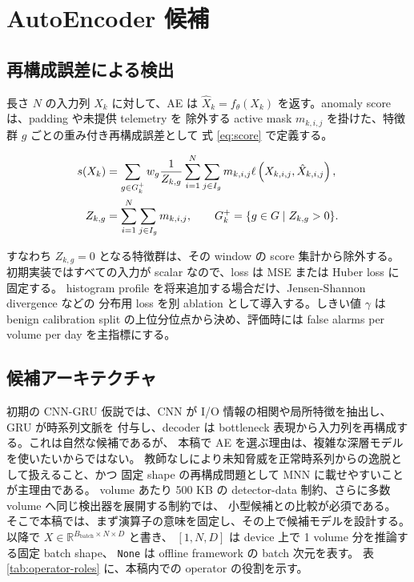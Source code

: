 \section{AutoEncoder 候補}

\subsection{再構成誤差による検出}

長さ $N$ の入力列 $X_k$ に対して、AE は
$\hat{X}_k=f_{\theta}(X_k)$ を返す。anomaly score は、padding や未提供 telemetry を
除外する active mask $m_{k,i,j}$ を掛けた、特徴群 $g$ ごとの重み付き再構成誤差として
式 \eqref{eq:score} で定義する。

\begin{align}
  s(X_k) &=
    \sum_{g \in G_k^+} w_g
    \frac{1}{Z_{k,g}}
    \sum_{i=1}^{N}
    \sum_{j \in I_g}
    m_{k,i,j}\ell \left(X_{k,i,j}, \hat{X}_{k,i,j}\right),
  \label{eq:score}
  \\
  Z_{k,g} &= \sum_{i=1}^{N}\sum_{j\in I_g}m_{k,i,j},
  \qquad
  G_k^+=\{g\in G \mid Z_{k,g}>0\}. \notag
\end{align}

すなわち $Z_{k,g}=0$ となる特徴群は、その window の score 集計から除外する。
初期実装ではすべての入力が scalar なので、loss は MSE または Huber loss に固定する。
histogram profile を将来追加する場合だけ、Jensen-Shannon divergence などの
分布用 loss を別 ablation として導入する。しきい値 $\gamma$ は
benign calibration split の上位分位点から決め、評価時には
false alarms per volume per day を主指標にする。

\subsection{候補アーキテクチャ}

初期の CNN-GRU 仮説では、CNN が I/O 情報の相関や局所特徴を抽出し、GRU が時系列文脈を
付与し、decoder は bottleneck 表現から入力列を再構成する。これは自然な候補であるが、
本稿で AE を選ぶ理由は、複雑な深層モデルを使いたいからではない。
教師なしにより未知脅威を正常時系列からの逸脱として扱えること、かつ
固定 shape の再構成問題として MNN に載せやすいことが主理由である。
volume あたり 500 KB の detector-data 制約、さらに多数 volume へ同じ検出器を展開する制約では、
小型候補との比較が必須である。
そこで本稿では、まず演算子の意味を固定し、その上で候補モデルを設計する。
以降で $X \in \mathbb{R}^{B_{\mathrm{batch}} \times N \times D}$ と書き、
$[1,N,D]$ は device 上で 1 volume 分を推論する固定 batch shape、
\texttt{None} は offline framework の batch 次元を表す。
表 \ref{tab:operator-roles} に、本稿内での operator の役割を示す。

